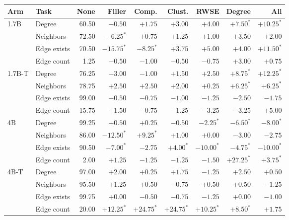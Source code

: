\begin{tabular}{llrrrrrrr}
\toprule
Arm & Task & None & Filler & Comp. & Clust. & RWSE & Degree & All \\
\midrule
1.7B & Degree & 60.50 & $-0.50$ & $+1.75$ & $+3.00$ & $+4.00$ & $+7.50^{*}$ & $+10.25^{*}$ \\
 & Neighbors & 72.50 & $-6.25^{*}$ & $+0.75$ & $+1.25$ & $+1.00$ & $+3.50$ & $+2.00$ \\
 & Edge exists & 70.50 & $-15.75^{*}$ & $-8.25^{*}$ & $+3.75$ & $+5.00$ & $+4.00$ & $+11.50^{*}$ \\
 & Edge count & 1.25 & $-0.50$ & $-1.00$ & $-0.50$ & $-0.75$ & $+3.00$ & $+0.75$ \\
\addlinespace[2pt]
1.7B-T & Degree & 76.25 & $-3.00$ & $-1.00$ & $+1.50$ & $+2.50$ & $+8.75^{*}$ & $+12.25^{*}$ \\
 & Neighbors & 78.75 & $+2.50$ & $+2.50$ & $+2.00$ & $+0.25$ & $+6.25^{*}$ & $+6.25^{*}$ \\
 & Edge exists & 99.00 & $-0.50$ & $-0.75$ & $-1.00$ & $-1.25$ & $-2.50$ & $-1.75$ \\
 & Edge count & 15.75 & $-1.50$ & $-0.75$ & $-1.25$ & $-3.25$ & $-3.25$ & $+5.00$ \\
\addlinespace[2pt]
4B & Degree & 99.25 & $-0.50$ & $+0.25$ & $-0.50$ & $-2.25^{*}$ & $-6.50^{*}$ & $-8.00^{*}$ \\
 & Neighbors & 86.00 & $-12.50^{*}$ & $+9.25^{*}$ & $+1.00$ & $+0.00$ & $-3.00$ & $-2.75$ \\
 & Edge exists & 90.50 & $-7.00^{*}$ & $-2.75$ & $+4.00^{*}$ & $-10.00^{*}$ & $-4.75^{*}$ & $-10.00^{*}$ \\
 & Edge count & 2.00 & $+1.25$ & $-1.25$ & $-1.25$ & $-1.50$ & $+27.25^{*}$ & $+3.75^{*}$ \\
\addlinespace[2pt]
4B-T & Degree & 97.00 & $+2.00$ & $+0.25$ & $+1.75$ & $-1.25$ & $+2.50$ & $+0.50$ \\
 & Neighbors & 95.50 & $+1.25$ & $+0.50$ & $-0.75$ & $+0.50$ & $+0.50$ & $-1.25$ \\
 & Edge exists & 99.75 & $+0.00$ & $-0.50$ & $-0.75$ & $-1.25$ & $+0.00$ & $-1.00$ \\
 & Edge count & 20.00 & $+12.25^{*}$ & $+24.75^{*}$ & $+24.75^{*}$ & $+10.25^{*}$ & $+8.50^{*}$ & $+1.75$ \\
\bottomrule
\end{tabular}